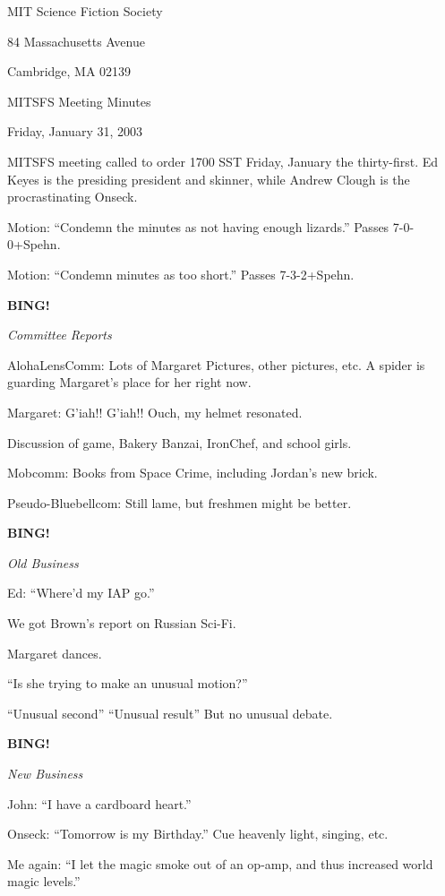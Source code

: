 \documentclass[12pt]{article}
\newcommand{\bing}{{\bf BING!} }
\newcommand{\goto}[1]{\bing \vskip 12pt \centerline{{\em{#1}}}}
\begin{document}
\begin{center}

MIT Science Fiction Society 

84 Massachusetts Avenue

Cambridge, MA 02139

\vspace{12pt}

MITSFS Meeting Minutes 

Friday, January 31, 2003

\end{center}
 
\vspace{18pt}

\setlength{\parskip}{6pt}

\noindent
MITSFS meeting called to order 1700 SST Friday, January the thirty-first.  Ed Keyes is the presiding president and skinner, while Andrew Clough is the procrastinating Onseck.

Motion:  ``Condemn the minutes as not having enough lizards.''  Passes 7-0-0+Spehn.

Motion:  ``Condemn minutes as too short.''  Passes 7-3-2+Spehn.

\goto{Committee Reports}

AlohaLensComm:  Lots of Margaret Pictures, other pictures, etc.  A spider is guarding Margaret's place for her right now.

Margaret:  G'iah!!  G'iah!!  Ouch, my helmet resonated.

Discussion of game, Bakery Banzai, IronChef, and school girls.

Mobcomm:  Books from Space Crime, including Jordan's new brick.

Pseudo-Bluebellcom:  Still lame, but freshmen might be better.

\goto{Old Business}

Ed:  ``Where'd my IAP go.''

We got Brown's report on Russian Sci-Fi.

Margaret dances.

``Is she trying to make an unusual motion?''

``Unusual second''  ``Unusual result''  But no unusual debate.

\goto{New Business}

John:  ``I have a cardboard heart.''

Onseck:  ``Tomorrow is my Birthday.''  Cue heavenly light, singing, etc.

Me again:  ``I let the magic smoke out of an op-amp, and thus increased world magic levels.''
\end{document}
